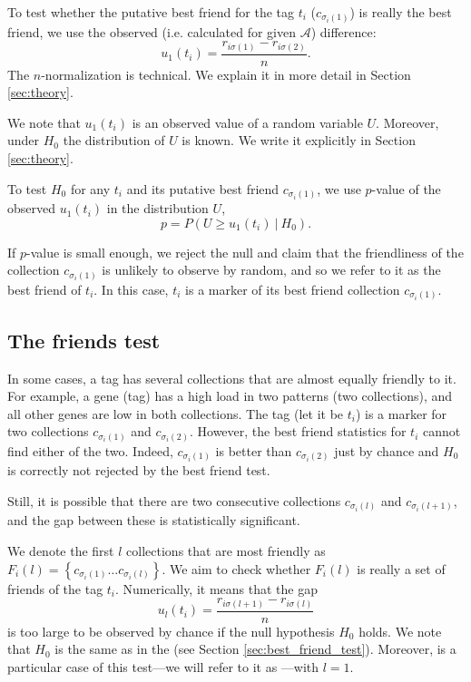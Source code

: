 \documentclass{llncs}
\begin{document}
To test whether the putative best friend for the tag $t_i$ ($c_{\sigma_i(1)}$) is really the best friend, we use the observed (i.e. calculated for given $\mathcal{A}$) difference:
\begin{equation}
\label{def:u_1}
u_1(t_i) = \frac{r_{i\sigma(1)} -  r_{i\sigma(2)}}{n}.
\end{equation}
The $n$-normalization is technical. We explain it in more detail in Section \ref{sec:theory}.

We note that $u_1(t_i)$ is an observed value of a random variable $U$. Moreover, under $H_0$ the distribution of $U$ is known. We write it explicitly in Section \ref{sec:theory}. 

To test $H_0$ for any $t_i$ and its putative best friend $c_{\sigma_{i}(1)}$, we use $p$-value of the observed $u_1(t_i)$ in the distribution $U$,
\[
p = P\left(U \ge u_1(t_i)~|~H_0\right). 
\]


If $p$-value is small enough, we reject the null and claim that the friendliness of the collection $c_{\sigma_{i}(1)}$ is unlikely to observe by random, and so we refer to it as the best friend of $t_i$. In this case, $t_i$ is a marker of its best friend collection $c_{\sigma_{i}(1)}$.

\subsection{The friends test}
\label{sec:friends_test}

In some cases, a tag has several collections that are almost equally friendly to it. 
For example, a gene (tag) has a high load in two patterns (two collections), and all other genes are low in both collections. The tag (let it be $t_i$) is a marker for two collections $c_{\sigma_{i}(1)}$ and $c_{\sigma_{i}(2)}$. However, the best friend statistics for $t_i$ cannot find either of the two. 
Indeed, $c_{\sigma_{i}(1)}$ is better than $c_{\sigma_{i}(2)}$ just by chance and $H_0$ is correctly not rejected by the best friend test.

Still, it is possible that there are two consecutive collections $c_{\sigma_i(l)}$ and $c_{\sigma_i(l+1)}$, and the gap between these is statistically significant.

We denote the first $l$ collections that are most friendly as $F_{i}(l) = \left\{ c_{\sigma_i(1)} \dots c_{\sigma_i(l)} \right\}$.
We aim to check whether $F_{i}(l)$ is really a set of friends of the tag $t_i$. Numerically, it means that the gap 
\begin{equation}
\label{def:u_l}
u_{l}(t_i) = \frac{r_{i\sigma(l+1)} - r_{i\sigma(l)}}{n}
\end{equation}
is too large to be observed by chance if the null hypothesis $H_0$ holds. We note that $H_0$ is the same as in the  (see Section \ref{sec:best_friend_test}).
Moreover,  is a particular case of
this test---we will refer to it as ---with $l = 1$.
\end{document}
